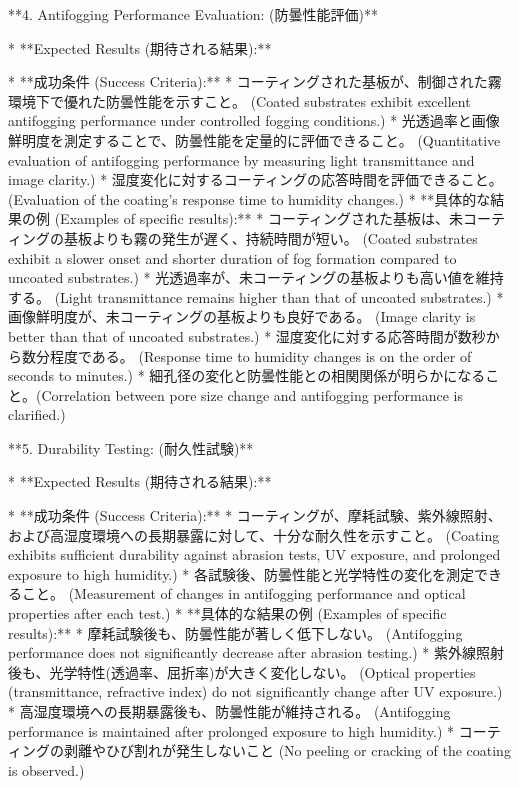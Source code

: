 \documentclass{article}
\begin{document}
**4. Antifogging Performance Evaluation: (防曇性能評価)**

*   **Expected Results (期待される結果):**

    *   **成功条件 (Success Criteria):**
        *   コーティングされた基板が、制御された霧環境下で優れた防曇性能を示すこと。 (Coated substrates exhibit excellent antifogging performance under controlled fogging conditions.)
        *   光透過率と画像鮮明度を測定することで、防曇性能を定量的に評価できること。 (Quantitative evaluation of antifogging performance by measuring light transmittance and image clarity.)
        *   湿度変化に対するコーティングの応答時間を評価できること。 (Evaluation of the coating's response time to humidity changes.)
    *   **具体的な結果の例 (Examples of specific results):**
        *   コーティングされた基板は、未コーティングの基板よりも霧の発生が遅く、持続時間が短い。 (Coated substrates exhibit a slower onset and shorter duration of fog formation compared to uncoated substrates.)
        *   光透過率が、未コーティングの基板よりも高い値を維持する。 (Light transmittance remains higher than that of uncoated substrates.)
        *   画像鮮明度が、未コーティングの基板よりも良好である。 (Image clarity is better than that of uncoated substrates.)
        *   湿度変化に対する応答時間が数秒から数分程度である。 (Response time to humidity changes is on the order of seconds to minutes.)
        *   細孔径の変化と防曇性能との相関関係が明らかになること。(Correlation between pore size change and antifogging performance is clarified.)

**5. Durability Testing: (耐久性試験)**

*   **Expected Results (期待される結果):**

    *   **成功条件 (Success Criteria):**
        *   コーティングが、摩耗試験、紫外線照射、および高湿度環境への長期暴露に対して、十分な耐久性を示すこと。 (Coating exhibits sufficient durability against abrasion tests, UV exposure, and prolonged exposure to high humidity.)
        *   各試験後、防曇性能と光学特性の変化を測定できること。 (Measurement of changes in antifogging performance and optical properties after each test.)
    *   **具体的な結果の例 (Examples of specific results):**
        *   摩耗試験後も、防曇性能が著しく低下しない。 (Antifogging performance does not significantly decrease after abrasion testing.)
        *   紫外線照射後も、光学特性(透過率、屈折率)が大きく変化しない。 (Optical properties (transmittance, refractive index) do not significantly change after UV exposure.)
        *   高湿度環境への長期暴露後も、防曇性能が維持される。 (Antifogging performance is maintained after prolonged exposure to high humidity.)
        *   コーティングの剥離やひび割れが発生しないこと (No peeling or cracking of the coating is observed.)
\end{document}
